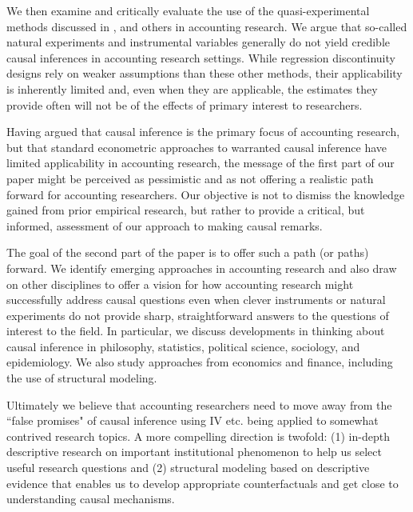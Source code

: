 \documentclass[11pt]{amsart}
\begin{document}
We then examine and critically evaluate the use of the quasi-experimental methods discussed in \citet{Angrist:2010jv}, \citet{Roberts:2013cz} and others in accounting research.
We argue that so-called natural experiments and instrumental variables generally do not yield credible causal inferences in accounting research settings.
While regression discontinuity designs rely on weaker assumptions than these other methods, their applicability is inherently limited and, even when they are applicable, the estimates they provide often will not be of the effects of primary interest to researchers.

Having argued that causal inference is the primary focus of accounting research, but that standard econometric approaches to warranted causal inference have limited applicability in accounting research, the message of the first part of our paper might be perceived as pessimistic and as not offering a realistic path forward for accounting researchers.
Our objective is not to dismiss the knowledge gained from prior empirical research, but rather to provide a critical, but informed, assessment of our approach to making causal remarks.  

The goal of the second part of the paper is to offer such a path (or paths) forward. 
We identify emerging approaches in accounting research and also draw on other disciplines to offer a vision for how accounting research might successfully address causal questions even when clever instruments or natural experiments do not provide sharp, straightforward answers to the questions of interest to the field.
In particular, we discuss developments in thinking about causal inference in philosophy, statistics, political science, sociology, and epidemiology.
We also study approaches from economics and finance, including the  use of structural modeling.



Ultimately we believe that accounting researchers need to move away from the ``false promises" of causal inference using IV etc. being applied to somewhat contrived research topics.  A more compelling direction is twofold:  (1) in-depth descriptive research on important institutional phenomenon to help us select useful research questions and (2) structural modeling  based on descriptive evidence that enables us to develop appropriate counterfactuals and get close to understanding causal mechanisms.    
\end{document}
